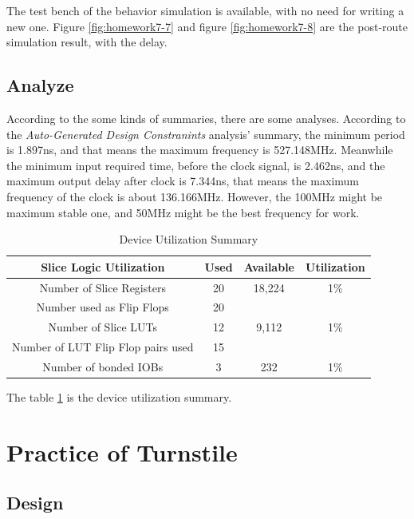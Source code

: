 \documentclass{article}
\begin{document}
    The test bench of the behavior simulation is available, with no need for writing a new one.
    Figure \ref{fig:homework7-7} and figure \ref{fig:homework7-8} are the post-route simulation
    result, with the delay.

    \subsection{Analyze}
    
    According to the some kinds of summaries, there are some analyses.
    According to the \textit{Auto-Generated Design Constranints} analysis' summary,
    the minimum period is 1.897ns, and that means the maximum frequency is 527.148MHz.
    Meanwhile the minimum input required time, before the clock signal, is 2.462ns, and 
    the maximum output delay after clock is 7.344ns, that means the maximum frequency of the clock
    is about 136.166MHz. However, the 100MHz might be maximum stable one, and 50MHz might be the best frequency for work.

    \begin{table}[h!]
        \centering
        \begin{tabular}{|c|c|c|c|}
            \hline Slice Logic Utilization & Used & Available & Utilization\\
            \hline Number of Slice Registers & 20 & 18,224 & 1\% \\ 
            \hline Number used as Flip Flops & 20 &  &  \\ 
            \hline Number of Slice LUTs & 12 & 9,112 & 1\% \\ 
            \hline Number of LUT Flip Flop pairs used & 15 &  &  \\ 
            \hline Number of bonded IOBs & 3 & 232 & 1\% \\ 
            \hline 
        \end{tabular} 
        \caption{Device Utilization Summary}
        \label{tab:c:dus}
    \end{table}
    
    The table \ref{tab:c:dus} is the device utilization summary.
    
    
    
    
    \section{Practice of Turnstile}
    \label{sec:turnstile}
    
    \subsection{Design}
    \label{sec:turnstile:design}
    
\end{document}
